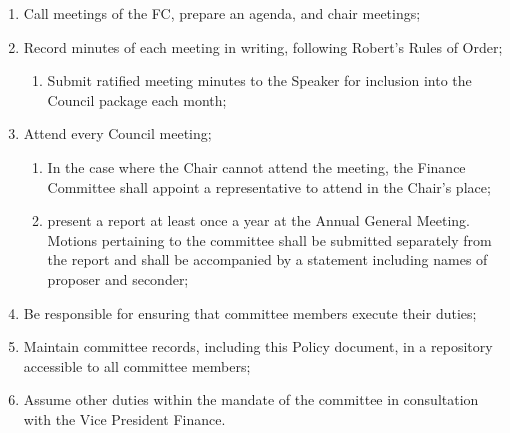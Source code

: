 \begin{enumerate}[label*=\arabic*., align=left]
\begin{enumerate}[label*=\arabic*., align=left]
\begin{enumerate}[label*=\arabic*., align=left]
\begin{enumerate}[label*=\arabic*., align=left]
			\end{enumerate}
		\item Call meetings of the FC, prepare an agenda, and chair meetings;
		\item Record minutes of each meeting in writing, following Robert's Rules of Order;
		\begin{enumerate}[label*=\arabic*., align=left]
			\item Submit ratified meeting minutes to the Speaker for inclusion into the Council package each month;
			\end{enumerate}
		\item Attend every Council meeting;
		\begin{enumerate}[label*=\arabic*., align=left] 
			\item In the case where the Chair cannot attend the meeting, the Finance Committee shall appoint a representative to attend in the Chair's place;
			\item present a report at least once a year at the Annual General Meeting. Motions pertaining to the committee shall be submitted separately from the report and shall be accompanied by a statement including names of proposer and seconder;
			\end{enumerate}
		\item Be responsible for ensuring that committee members execute their duties;
		\item Maintain committee records, including this Policy document, in a repository accessible to all committee members;
		\item Assume other duties within the mandate of the committee in consultation with the Vice President Finance.
		\end{enumerate}
	\end{enumerate}
\end{enumerate}

